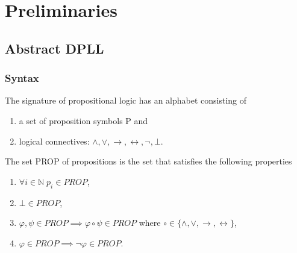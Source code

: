 \chapter{Preliminaries}
\section{Abstract DPLL}
\subsection{Syntax}
\begin{definition}
The signature of propositional logic has an alphabet consisting of
\begin{enumerate}
\item a set of proposition symbols P and
\item logical connectives: $\wedge, \vee, \rightarrow, \leftrightarrow, \neg, \bot$.
\end{enumerate}
\end{definition}

\begin{definition}
The set PROP of propositions is the set that satisfies the following properties
\begin{enumerate}
\item $\forall i \in \mathbb{N} \; p_i \in PROP$,
\item $\bot \in PROP$,
\item $\varphi, \psi \in PROP \implies \varphi \circ \psi \in PROP$ where $\circ \in \{\wedge, \vee, \rightarrow, \leftrightarrow\}$,
\item $\varphi \in PROP \implies \neg\varphi \in PROP$.
\end{enumerate}
\end{definition}
